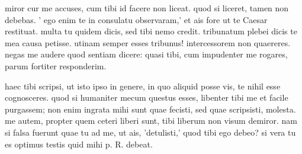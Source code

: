 


 miror cur me accuses, cum tibi id facere non liceat. quod si liceret, tamen non debebas. ' ego enim te in consulatu observaram,' et ais fore ut te Caesar restituat. multa tu quidem dicis, sed tibi nemo credit. tribunatum plebei dicis te mea causa petisse. utinam semper esses tribunus! intercessorem non quaereres. negas me audere quod sentiam dicere: quasi tibi, cum impudenter me rogares, parum fortiter responderim.

 haec tibi scripsi, ut isto ipso in genere, in quo aliquid posse vis, te nihil esse cognosceres. quod si humaniter mecum questus esses, libenter tibi me et facile purgassem; non enim ingrata mihi sunt quae fecisti, sed quae scripsisti, molesta. me autem, propter quem ceteri liberi sunt, tibi liberum non visum demiror. nam si falsa fuerunt quae tu ad me, ut ais, 'detulisti,' quod tibi ego debeo? si vera tu es optimus testis quid mihi p. R. debeat.
